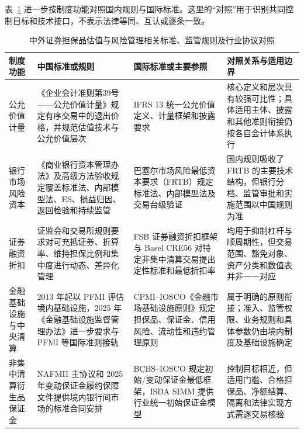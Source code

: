 表~\ref{tab:review-standards-cn-intl} 进一步按制度功能对照国内规则与国际标准。这里的“对照”用于识别共同控制目标和技术接口，不表示法律等同、互认或逐条一致。

\begin{table}[htbp]
  \centering
  \caption{中外证券担保品估值与风险管理相关标准、监管规则及行业协议对照}
  \label{tab:review-standards-cn-intl}
  \ReportTableText
  \begin{tabularx}{\textwidth}{@{}p{6.5em}XXX@{}}
    \toprule
    制度功能 & 中国标准或规则 & 国际标准或主要参照 & 对照关系与适用边界 \\
    \midrule
    公允价值计量 & 《企业会计准则第39号——公允价值计量》规定有序交易中的退出价格，并规范估值技术与公允价值层次\cite{cas39_fair_value_2014} & IFRS 13 统一公允价值定义、计量框架和披露要求\cite{ifrs13_fair_value_2011} & 核心定义和层次具有较强可比性；具体适用主体、披露和其他准则衔接仍按各自会计体系执行 \\
    银行市场风险资本 & 《商业银行资本管理办法》及高级方法验收规定覆盖标准法、内部模型法、ES、损益归因、返回检验和持续监管\cite{nfra_capital_2023,nfra_advanced_methods_2024} & 巴塞尔市场风险最低资本要求（FRTB）规定标准法、内部模型法及交易台级验证\cite{bcbs_2019_market_risk} & 国内规则吸收了 FRTB 的主要技术结构，但银行分档、监管审批和实施范围以中国规则为准 \\
    证券融资折扣 & 证监会和交易所规则要求对可充抵证券、折算率、维持担保比例和集中度进行动态、差异化管理\cite{csrc_margin_financing_2015,sse_margin_rules_2023} & FSB 证券融资折扣框架与 Basel CRE56 对特定非集中清算交易提出定性标准和最低折扣率\cite{fsb_sft_haircuts_2020,basel_sft_haircut_floors_2021} & 均用于抑制杠杆与顺周期性，但交易范围、豁免对象、资产分类和数值表并非一一对应 \\
    金融基础设施与中央清算 & 2013 年起以 PFMI 评估境内基础设施，2025 年《金融基础设施监督管理办法》进一步要求与 PFMI 等国际准则接轨\cite{pbc_csrc_pfmi_assessment_2014,pbc_csrc_fmi_rules_2025} & CPMI--IOSCO《金融市场基础设施原则》规定担保品、保证金、信用风险、流动性和违约管理原则\cite{cpmi_iosco_pfmi_2012} & 属于明确的原则衔接；准入、监管权限、业务规则和具体参数仍由境内制度及基础设施确定 \\
    非集中清算衍生品保证金 & NAFMII 主协议和 2025 年变动保证金履约保障文件提供境内银行间市场的标准合同安排\cite{nafmii_vm_2025} & BCBS--IOSCO 规定初始/变动保证金最低框架，ISDA SIMM 提供行业统一初始保证金模型\cite{bcbs_iosco_margin_2015,isda_simm_2025} & 控制目标相近，但适用门槛、合格担保品、净额结算、隔离和法律实现方式需逐交易核验 \\
    \bottomrule
  \end{tabularx}
\end{table}

